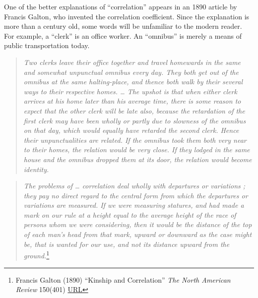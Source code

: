 \documentclass[
  letterpaper,
  DIV=11,
  numbers=noendperiod,
  oneside]{scrreprt}
\begin{document}
\begin{tcolorbox}[enhanced jigsaw, colbacktitle=quarto-callout-note-color!10!white, breakable, opacitybacktitle=0.6, colback=white, left=2mm, arc=.35mm, colframe=quarto-callout-note-color-frame, coltitle=black, toprule=.15mm, opacityback=0, leftrule=.75mm, bottomtitle=1mm, toptitle=1mm, titlerule=0mm, title=\textcolor{quarto-callout-note-color}{\faInfo}\hspace{0.5em}{Note}, rightrule=.15mm, bottomrule=.15mm]

One of the better explanations of ``correlation'' appears in an 1890
article by Francis Galton, who invented the correlation coefficient.
Since the explanation is more than a century old, some words will be
unfamiliar to the modern reader. For example, a ``clerk'' is an office
worker. An ``omnibus'' is merely a means of public transportation today.

\begin{quote}
\emph{Two clerks leave their office together and travel homewards in the
same and somewhat unpunctual omnibus every day. They both get out of the
omnibus at the same halting-place, and thence both walk by their several
ways to their respective homes. \ldots{} The upshot is that when either
clerk arrives at his home later than his average time, there is some
reason to expect that the other clerk will be late also, because the
retardation of the first clerk may have been wholly or partly due to
slowness of the omnibus on that day, which would equally have retarded
the second clerk. Hence their unpunctualities are related. If the
omnibus took them both very near to their homes, the relation would be
very close. If they lodged in the same house and the omnibus dropped
them at its door, the relation would become identity.}
\end{quote}

\begin{quote}
\emph{The problems of \ldots{} correlation deal wholly with departures
or variations ; they pay no direct regard to the central form from which
the departures or variations are measured. If we were measuring
statures, and had made a mark on our rule at a height equal to the
average height of the race of persons whom we were considering, then it
would be the distance of the top of each man's head from that mark,
upward or downward as the case might be, that is wanted for our use, and
not its distance upward from the ground.}\footnote{Francis Galton (1890)
  ``Kinship and Correlation'' \emph{The North American Review} 150(401)
  \href{https://www.jstor.org/stable/25101964}{URL}}
\end{quote}

\end{tcolorbox}
\end{document}
